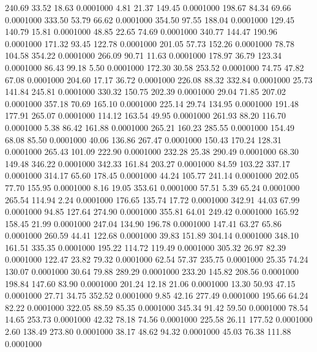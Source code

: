  240.69   33.52   18.63   0.0001000
   4.81   21.37  149.45   0.0001000
 198.67   84.34   69.66   0.0001000
 333.50   53.79   66.62   0.0001000
 354.50   97.55  188.04   0.0001000
 129.45  140.79   15.81   0.0001000
  48.85   22.65   74.69   0.0001000
 340.77  144.47  190.96   0.0001000
 171.32   93.45  122.78   0.0001000
 201.05   57.73  152.26   0.0001000
  78.78  104.58  354.22   0.0001000
 266.09   90.71   11.63   0.0001000
 178.97   36.79  123.34   0.0001000
  86.43   99.18    5.50   0.0001000
 172.30   30.58  253.52   0.0001000
  74.75   47.82   67.08   0.0001000
 204.60   17.17   36.72   0.0001000
 226.08   88.32  332.84   0.0001000
  25.73  141.84  245.81   0.0001000
 330.32  150.75  202.39   0.0001000
  29.04   71.85  207.02   0.0001000
 357.18   70.69  165.10   0.0001000
 225.14   29.74  134.95   0.0001000
 191.48  177.91  265.07   0.0001000
 114.12  163.54   49.95   0.0001000
 261.93   88.20  116.70   0.0001000
   5.38   86.42  161.88   0.0001000
 265.21  160.23  285.55   0.0001000
 154.49   68.08   85.50   0.0001000
  40.06  136.86  267.47   0.0001000
 150.43  170.24  128.31   0.0001000
 265.43  101.09  222.90   0.0001000
 232.28   25.38  290.49   0.0001000
  68.30  149.48  346.22   0.0001000
 342.33  161.84  203.27   0.0001000
  84.59  103.22  337.17   0.0001000
 314.17   65.60  178.45   0.0001000
  44.24  105.77  241.14   0.0001000
 202.05   77.70  155.95   0.0001000
   8.16   19.05  353.61   0.0001000
  57.51    5.39   65.24   0.0001000
 265.54  114.94    2.24   0.0001000
 176.65  135.74   17.72   0.0001000
 342.91   44.03   67.99   0.0001000
  94.85  127.64  274.90   0.0001000
 355.81   64.01  249.42   0.0001000
 165.92  158.45   21.99   0.0001000
 247.04  134.90  196.78   0.0001000
 147.41   63.27   65.86   0.0001000
 260.59   44.41  122.68   0.0001000
  39.83  151.89  304.14   0.0001000
 348.10  161.51  335.35   0.0001000
 195.22  114.72  119.49   0.0001000
 305.32   26.97   82.39   0.0001000
 122.47   23.82   79.32   0.0001000
  62.54   57.37  235.75   0.0001000
  25.35   74.24  130.07   0.0001000
  30.64   79.88  289.29   0.0001000
 233.20  145.82  208.56   0.0001000
 198.84  147.60   83.90   0.0001000
 201.24   12.18   21.06   0.0001000
  13.30   50.93   47.15   0.0001000
  27.71   34.75  352.52   0.0001000
   9.85   42.16  277.49   0.0001000
 195.66   64.24   82.22   0.0001000
 322.05   88.59   85.35   0.0001000
 345.34   91.42   59.50   0.0001000
  78.54   14.65  253.73   0.0001000
  42.32   78.18   74.56   0.0001000
 225.58   26.11  177.52   0.0001000
   2.60  138.49  273.80   0.0001000
  38.17   48.62   94.32   0.0001000
  45.03   76.38  111.88   0.0001000
